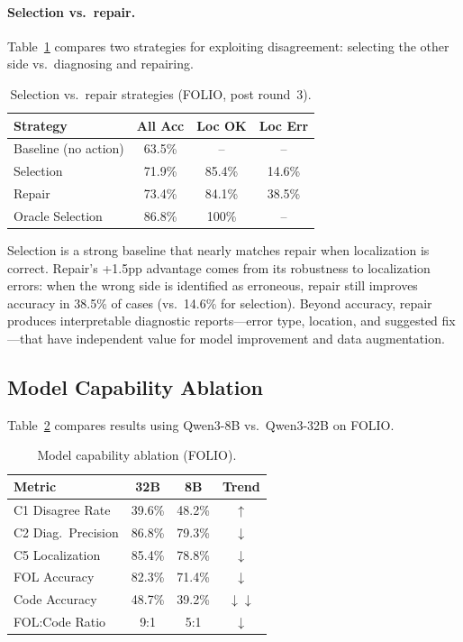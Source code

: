 \documentclass[11pt,a4paper]{article}
\begin{document}
\paragraph{Selection vs.\ repair.}
Table~\ref{tab:selection} compares two strategies for exploiting disagreement: selecting the other side vs.\ diagnosing and repairing.

\begin{table}[t]
\centering
\small
\caption{Selection vs.\ repair strategies (FOLIO, post round~3).}
\label{tab:selection}
\begin{tabular}{@{}lccc@{}}
\toprule
\textbf{Strategy} & \textbf{All Acc} & \textbf{Loc OK} & \textbf{Loc Err} \\
\midrule
Baseline (no action) & 63.5\% & -- & -- \\
Selection & 71.9\% & 85.4\% & 14.6\% \\
Repair & 73.4\% & 84.1\% & 38.5\% \\
Oracle Selection & 86.8\% & 100\% & -- \\
\bottomrule
\end{tabular}
\end{table}

Selection is a strong baseline that nearly matches repair when localization is correct. Repair's +1.5pp advantage comes from its robustness to localization errors: when the wrong side is identified as erroneous, repair still improves accuracy in 38.5\% of cases (vs.\ 14.6\% for selection). Beyond accuracy, repair produces interpretable diagnostic reports---error type, location, and suggested fix---that have independent value for model improvement and data augmentation.

\subsection{Model Capability Ablation}
\label{sec:model-ablation}

Table~\ref{tab:8b} compares results using Qwen3-8B vs.\ Qwen3-32B on FOLIO.

\begin{table}[t]
\centering
\small
\caption{Model capability ablation (FOLIO).}
\label{tab:8b}
\begin{tabular}{@{}lccc@{}}
\toprule
\textbf{Metric} & \textbf{32B} & \textbf{8B} & \textbf{Trend} \\
\midrule
C1 Disagree Rate & 39.6\% & 48.2\% & $\uparrow$ \\
C2 Diag.\ Precision & 86.8\% & 79.3\% & $\downarrow$ \\
C5 Localization & 85.4\% & 78.8\% & $\downarrow$ \\
FOL Accuracy & 82.3\% & 71.4\% & $\downarrow$ \\
Code Accuracy & 48.7\% & 39.2\% & $\downarrow\downarrow$ \\
FOL:Code Ratio & 9:1 & 5:1 & $\downarrow$ \\
\bottomrule
\end{tabular}
\end{table}
\end{document}
